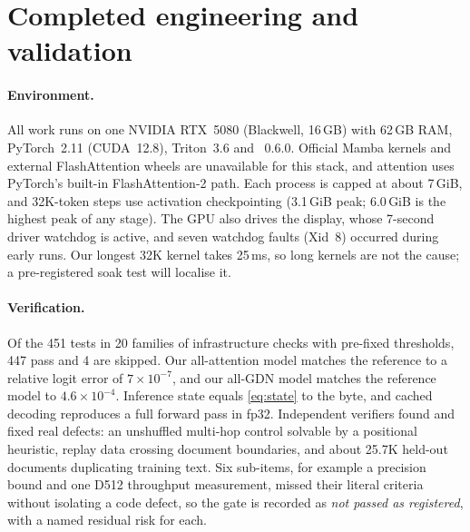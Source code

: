 \documentclass[10pt,a4paper]{article}
\begin{document}
\section{Completed engineering and validation}
\paragraph{Environment.} All work runs on one NVIDIA RTX~5080 (Blackwell, 16\,GB) with 62\,GB RAM, PyTorch~2.11
(CUDA~12.8), Triton~3.6 and ~0.6.0. Official Mamba kernels and external
FlashAttention wheels are unavailable for this stack, and attention uses PyTorch's built-in
FlashAttention-2 path. Each process is capped at about 7\,GiB, and 32K-token steps use activation
checkpointing (3.1\,GiB peak; 6.0\,GiB is the highest peak of any stage). The GPU also drives the display, whose
7-second driver watchdog is active, and seven watchdog faults (Xid~8) occurred during early runs. Our longest
32K kernel takes 25\,ms, so long kernels are not the cause; a pre-registered soak test will localise it.

\paragraph{Verification.} Of the 451 tests in 20 families of infrastructure checks with pre-fixed
thresholds, 447 pass and 4 are skipped. Our all-attention model matches the reference  to a relative
logit error of $7\times10^{-7}$, and our all-GDN model matches the reference  model to $4.6\times10^{-4}$.
Inference state equals \cref{eq:state} to the byte, and cached decoding reproduces a full forward pass in fp32.
Independent verifiers found and fixed real defects: an unshuffled multi-hop control solvable by a positional heuristic, replay data
crossing document boundaries, and about 25.7K held-out documents duplicating training text. Six sub-items, for
example a precision bound and one D512 throughput measurement, missed their literal criteria without isolating a
code defect, so the gate is recorded as \emph{not passed as registered}, with a named residual risk for each.
\end{document}
